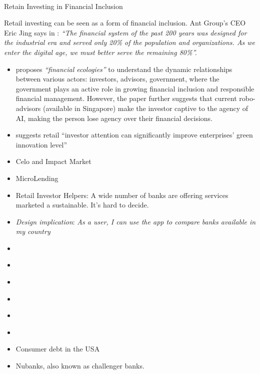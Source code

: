 \documentclass[
  letterpaper,
  DIV=11,
  numbers=noendperiod]{scrartcl}
\makeatletter
\let\oldparagraph\paragraph
\renewcommand{\paragraph}{
    \@ifstar
      \xxxParagraphStar
      \xxxParagraphNoStar
  }
\newcommand{\xxxParagraphStar}[1]{\oldparagraph*{#1}\mbox{}}
\newcommand{\xxxParagraphNoStar}[1]{\oldparagraph{#1}\mbox{}}
\makeatother
\begin{document}
\paragraph{Retain Investing in Financial
Inclusion}\label{retain-investing-in-financial-inclusion}

Retail investing can be seen as a form of financial inclusion. Ant
Group's CEO Eric Jing says in \citet{turrinCashlessChinaDigital2021}:
\emph{``The financial system of the past 200 years was designed for the
industrial era and served only 20\% of the population and organizations.
As we enter the digital age, we must better serve the remaining 80\%''.}

\begin{itemize}
\item
  \citet{TAN202046} proposes \emph{``financial ecologies''} to
  understand the dynamic relationships between various actors:
  investors, advisors, government, where the government plays an active
  role in growing financial inclusion and responsible financial
  management. However, the paper further suggests that current
  robo-advisors (available in Singapore) make the investor captive to
  the agency of AI, making the person lose agency over their financial
  decisions.
\item
  \citet{liCanRetailInvestors2022} suggests retail ``investor attention
  can significantly improve enterprises' green innovation level''
\item
  Celo and Impact Market
\item
  MicroLending
\item
  Retail Investor Helpers: A wide number of banks are offering services
  marketed a sustainable. It's hard to decide.
\item
  \emph{Design implication}: \emph{As a user, I can use the app to
  compare banks available in my country}
\item
  \citet{rupertjonesGreenMoneyHow2022}
\item
  \citet{jacksonEcoFriendlyGuideFinances2020}
\item
  \citet{stefSustainableMoneyDesign2019}
\item
  \citet{MakeMyMoney2023}
\item
  \citet{seekingalphaBooksThatChanged2020}
\item
  \citet{markoTeekondMiljoniliseInvesteerimisportfellini2022}
\item
  Consumer debt in the USA
\item
  Nubanks, also known as challenger banks.
\end{itemize}
\end{document}
